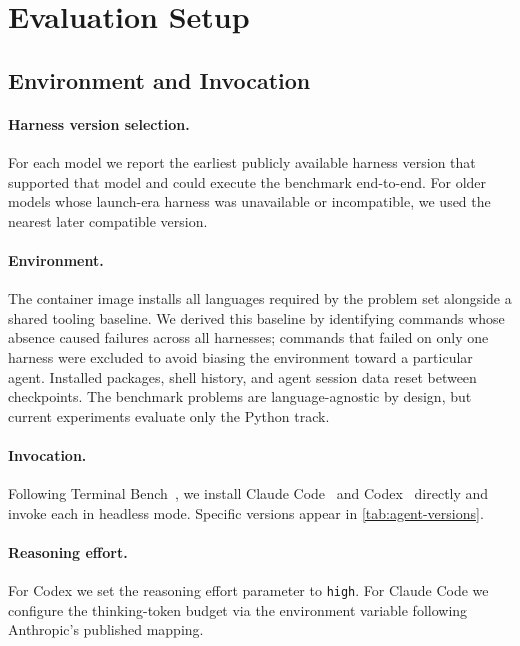\section{Evaluation Setup}\label{sec:eval-env-details}

\subsection{Environment and Invocation}

\paragraph{Harness version selection.} For each model we report the earliest publicly available harness version that supported that model and could execute the benchmark end-to-end. For older models whose launch-era harness was unavailable or incompatible, we used the nearest later compatible version.

\paragraph{Environment.} The container image installs all languages required by the problem set alongside a shared tooling baseline. We derived this baseline by identifying commands whose absence caused failures across all harnesses; commands that failed on only one harness were excluded to avoid biasing the environment toward a particular agent. Installed packages, shell history, and agent session data reset between checkpoints. The benchmark problems are language-agnostic by design, but current experiments evaluate only the Python track.

\paragraph{Invocation.} Following Terminal Bench~\citep{tb2}, we install Claude Code~\citep{claude_code} and Codex~\citep{codex} directly and invoke each in headless mode. Specific versions appear in \autoref{tab:agent-versions}.

\paragraph{Reasoning effort.} For Codex we set the reasoning effort parameter to \texttt{high}. For Claude Code we configure the thinking-token budget via the environment variable following Anthropic's published mapping.

